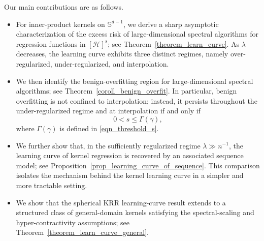 \documentclass{article}
\theoremstyle{plain}
\theoremstyle{definition}
\theoremstyle{remark}
\newcommand{\dhrev}[2]{{\color{cyan}[Old:]\textit{#1}} {\color{magenta}[New]#2}} %
\begin{document}
Our main contributions are as follows.
\begin{itemize}
    \item For inner-product kernels on $\mathbb{S}^{d-1}$, we derive a sharp asymptotic characterization of the excess risk of large-dimensional spectral algorithms for regression functions in $[\mathcal H]^s$; see Theorem~\ref{theorem_learn_curve}. 
    As $\lambda$ decreases, the learning curve exhibits three distinct regimes, namely {over-regularized}, {under-regularized}, and interpolation.
    

    \item We then identify the benign-overfitting region for large-dimensional spectral algorithms; see Theorem~\ref{coroll_benign_overfit}. 
    In particular, benign overfitting is not confined to interpolation; instead, it persists throughout the under-regularized regime and at interpolation if and only if
    \[
    0<s\leq \Gamma(\gamma),
    \]
    where $\Gamma(\gamma)$ is defined in \eqref{eqn_threshold_s}.

    \item 

    We further show that, in the sufficiently regularized regime $\lambda\gg n^{-1}$, the learning curve of kernel regression is recovered by an associated sequence model; see Proposition~\ref{prop_learning_curve_of_sequence}. This comparison isolates the mechanism behind the kernel learning curve in a simpler and more tractable setting.

    \item We show that the spherical KRR learning-curve result extends to a structured class of general-domain kernels satisfying the spectral-scaling and hyper-contractivity assumptions; see Theorem~\ref{theorem_learn_curve_general}.
    
    
\end{itemize}
\end{document}
